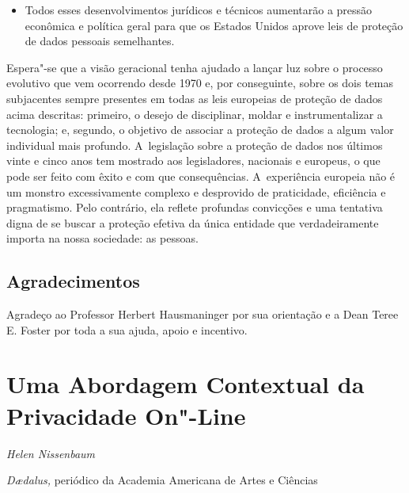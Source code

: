 \begin{itemize}
\item Todos esses desenvolvimentos jurídicos e técnicos aumentarão a pressão
econômica e política geral para que os Estados Unidos aprove leis de
proteção de dados pessoais semelhantes.
\end{itemize}

Espera"-se que a visão geracional tenha ajudado a lançar luz sobre o
processo evolutivo que vem ocorrendo desde 1970 e, por conseguinte,
sobre os dois temas subjacentes sempre presentes em todas as leis
europeias de proteção de dados acima descritas: primeiro, o desejo de
disciplinar, moldar e instrumentalizar a tecnologia; e, segundo, o
objetivo de associar a proteção de dados a algum valor individual mais
profundo. A~legislação sobre a proteção de dados nos últimos vinte e
cinco anos tem mostrado aos legisladores, nacionais e europeus, o que
pode ser feito com êxito e com que consequências. A~experiência europeia
não é um monstro excessivamente complexo e desprovido de praticidade,
eficiência e pragmatismo. Pelo contrário, ela reflete profundas
convicções e uma tentativa digna de se buscar a proteção efetiva da
única entidade que verdadeiramente importa na nossa sociedade: as
pessoas.

\section{Agradecimentos}

Agradeço ao Professor Herbert Hausmaninger por sua orientação e a Dean
Teree E. Foster por toda a sua ajuda, apoio e incentivo.

\chapter{Uma Abordagem Contextual da Privacidade
On"-Line}\label{uma-abordagem-contextual-da-privacidade-on-line}

\begin{flushright}
\emph{Helen Nissenbaum}
\end{flushright}

\emph{Dædalus,} periódico da Academia Americana de Artes e Ciências

